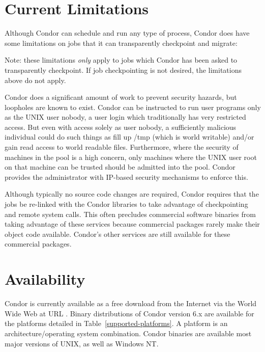 
\section{\label{sec:current-limitations}Current Limitations}

\begin{description}

	\item[Limitations on Jobs which can Checkpointed] Although Condor can schedule and
run any type of process, Condor does have some limitations on jobs that it can
transparently checkpoint and migrate:



	Note: these limitations \emph{only} apply to jobs which Condor
has been asked to transparently checkpoint.  If job checkpointing is not
desired, the limitations above do not apply.

	\item[Security Implications.] Condor does a significant amount of work to prevent 
security hazards, but loopholes are known to exist.  Condor can be instructed 
to run user programs only as the UNIX user nobody, a user login which traditionally has very 
restricted access.  But even with access solely as user nobody, a sufficiently 
malicious individual could do such things as fill up /tmp (which is world writable) and/or gain 
read access to world readable files.
Furthermore, where the security of machines in the pool is a high concern, 
only machines where the UNIX user root on that machine can be trusted should be admitted
into the pool. Condor provides the administrator with IP-based security mechanisms 
to enforce this.

	\item[Jobs Need to be Re-linked to get Checkpointing and Remote System Calls] Although 
typically no source code changes are required,
Condor requires
that the jobs be re-linked with the Condor libraries to take
advantage of checkpointing and remote system calls. This often
precludes commercial software binaries from taking advantage of these services
because commercial packages rarely make their object code
available. 
Condor's other services are still available for these commercial packages.

\end{description}

\section{\label{sec:Availability}Availability}
Condor is currently available as a free download from the Internet via the World Wide Web at  
URL .
Binary distributions of Condor version 6.x are available for the platforms 
detailed in Table~\ref{supported-platforms}.  A platform is an 
architecture/operating system combination.  
Condor binaries are available most major versions of UNIX, as well as
Windows NT.  

